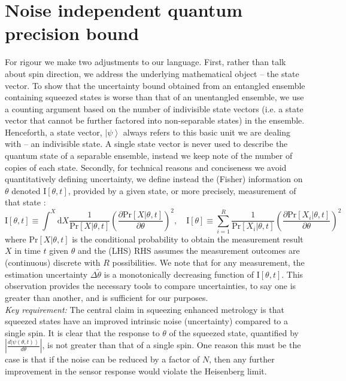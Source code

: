 \documentclass[reqno]{amsart}
\def\be{\begin{equation}}
\def\ee{\end{equation}}
\def\est#1{\tilde{#1}}
\newcommand{\ket}[1]{\left| #1 \right>}
\def\func#1#2{\mathrm{#1}\left[#2\right]}
\begin{document}
\section*{Noise independent quantum precision bound}%
For rigour we make two adjustments to our language. First, rather than talk about spin direction, we address the underlying mathematical object -- the state vector. To show that the uncertainty bound obtained from an entangled ensemble containing squeezed states is worse than that of an unentangled ensemble, we use a counting argument based on the number of indivisible state vectors (i.e. a state vector that cannot be further factored into non-separable states) in the ensemble. Henceforth, a state vector, $\ket{\psi}$ always refers to this basic unit we are dealing with -- an indivisible state. A single state vector is never used to describe the quantum state of a separable ensemble, instead we keep note of the number of copies of each state. Secondly, for technical reasons and conciseness we avoid quantitatively defining uncertainty, we define instead the (Fisher) information on $\theta$ denoted $\func{I}{\theta,t}$, provided by a given state, or more precisely, measurement of that state \cite{Braunstein1994}:
\be
\func{I}{\theta,t} \equiv \int^{X} \mathrm{d}X \frac{1}{\func{Pr}{X|\theta,t}}\left(\frac{\partial \func{Pr}{X|\theta,t}}{\partial \theta}\right)^2, \quad \func{I}{\theta} \equiv \sum_{i=1}^R \frac{1}{\func{Pr}{X_i|\theta,t}}\left(\frac{\partial \func{Pr}{X_i|\theta,t}}{\partial \theta}\right)^2
\label{eq:QFI}
\ee
where $\func{Pr}{X|\theta,t}$ is the conditional probability to obtain the measurement result $X$ in time $t$ given $\theta$ and the (LHS) RHS assumes the measurement outcomes are (continuous) discrete with $R$ possibilities. We note that for any measurement, the estimation uncertainty $\Delta \est{\theta}$ is a monotonically decreasing function of $\func{I}{\theta,t}$. This observation provides the necessary tools to compare uncertainties, to say one is greater than another, and is sufficient for our purposes.\\

\emph{Key requirement:} The central claim in squeezing enhanced metrology is that squeezed states have an improved intrinsic noise (uncertainty) compared to a single spin. It is clear that the response to $\theta$ of the squeezed state, quantified by $\left|\frac{d\ket{\psi(\theta,t)}}{d \theta}\right|$, is not greater than that of a single spin. One reason this must be the case is that if the noise can be reduced by a factor of $N$, then any further improvement in the sensor response would violate the Heisenberg limit.\\%
\end{document}
